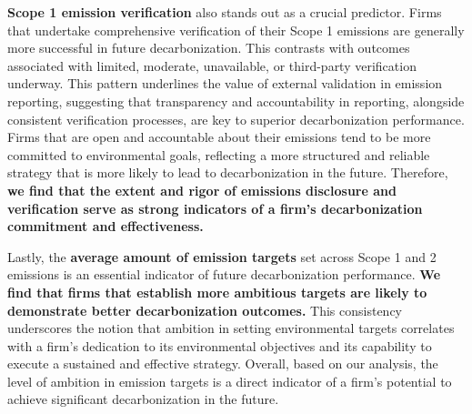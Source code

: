 \textbf{Scope 1 emission verification} also stands out as a crucial predictor. Firms that undertake comprehensive verification of their Scope 1 emissions are generally more successful in future decarbonization. This contrasts with outcomes associated with limited, moderate, unavailable, or third-party verification underway. This pattern underlines the value of external validation in emission reporting, suggesting that transparency and accountability in reporting, alongside consistent verification processes, are key to superior decarbonization performance. Firms that are open and accountable about their emissions tend to be more committed to environmental goals, reflecting a more structured and reliable strategy that is more likely to lead to decarbonization in the future. Therefore, \textbf{we find that the extent and rigor of emissions disclosure and verification serve as strong indicators of a firm's decarbonization commitment and effectiveness.}

Lastly, the \textbf{average amount of emission targets} set across Scope 1 and 2 emissions is an essential indicator of future decarbonization performance. \textbf{We find that firms that establish more ambitious targets are likely to demonstrate better decarbonization outcomes.} This consistency underscores the notion that ambition in setting environmental targets correlates with a firm's dedication to its environmental objectives and its capability to execute a sustained and effective strategy. Overall, based on our analysis, the level of ambition in emission targets is a direct indicator of a firm's potential to achieve significant decarbonization in the future.


